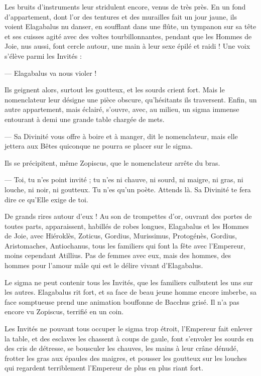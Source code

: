\documentclass[a4paper, 11pt, oneside, polutonikogreek, french]{article}
\begin{document}
Les bruits d'instruments leur stridulent encore, venus de très près. En un fond d'appartement, dont l'or des tentures et des murailles fait un jour jaune, ils voient Elagabalus nu danser, en soufflant dans une flûte, un tympanon sur sa tête et ses cuisses agité avec des voltes tourbillonnantes, pendant que les Hommes de Joie, nus aussi, font cercle autour, une main à leur sexe épilé et raidi ! Une voix s'élève parmi les Invités :

--- Elagabalus va nous violer !

Ils geignent alors, surtout les goutteux, et les sourds crient fort. Mais le nomenclateur leur désigne une pièce obscure, qu'hésitants ils traversent. Enfin, un autre appartement, mais éclairé, s'ouvre, avec, au milieu, un sigma immense entourant à demi une grande table chargée de mets.

--- Sa Divinité vous offre à boire et à manger, dit le nomenclateur, mais elle jettera aux Bêtes quiconque ne pourra se placer sur le sigma.

Ils se précipitent, même Zopiscus, que le nomenclateur arrête du bras.

--- Toi, tu n'es point invité ; tu n'es ni chauve, ni sourd, ni maigre, ni gras, ni louche, ni noir, ni goutteux. Tu n'es qu'un poète. Attends là. Sa Divinité te fera dire ce qu'Elle exige de toi.

De grands rires autour d’eux ! Au son de trompettes d'or, ouvrant des portes de toutes parts, apparaissent, habillés de robes longues, Elagabalus et les Hommes de Joie, avec Hiéroklès, Zoticus, Gordius, Murissimus, Protogénès, Gordius, Aristomaches, Antiochanus, tous les familiers qui font la fête avec l'Empereur, moins cependant Atillius. Pas de femmes avec eux, mais des hommes, des hommes pour l'amour mâle qui est le délire vivant d'Elagabalus.

Le sigma ne peut contenir tous les Invités, que les familiers culbutent les uns sur les autres. Elagabalus rit fort, et sa face de beau jeune homme encore imberbe, sa face somptueuse prend une animation bouffonne de Bacchus grisé. Il n'a pas encore vu Zopiscus, terrifié en un coin.

Les Invités ne pouvant tous occuper le sigma trop étroit, l'Empereur fait enlever la table, et des esclaves les chassent à coups de gaule, font s'envoler les sourds en des cris de détresse, se bousculer les chauves, les mains à leur crâne dénudé, frotter les gras aux épaules des maigres, et pousser les goutteux sur les louches qui regardent terriblement l'Empereur de plus en plus riant fort.
\end{document}
